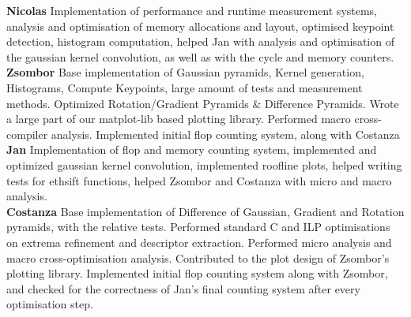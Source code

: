 \documentclass[letterpaper]{article}
\begin{document}
\textbf{Nicolas} Implementation of performance and runtime measurement systems, analysis and optimisation of memory allocations and layout, optimised keypoint detection, histogram computation, helped Jan with analysis and optimisation of the gaussian kernel convolution, as well as with the cycle and memory counters. \\

\textbf{Zsombor} Base implementation of Gaussian pyramids, Kernel generation, Histograms, Compute Keypoints, large amount of tests and measurement methods. Optimized Rotation/Gradient Pyramids & Difference Pyramids. Wrote a large part of our matplot-lib based plotting library. Performed macro cross-compiler analysis. Implemented initial flop counting system, along with Costanza \\

\textbf{Jan} Implementation of flop and memory counting system, implemented and optimized gaussian kernel convolution, implemented roofline plots, helped writing tests for ethsift functions, helped Zsombor and Costanza with micro and macro analysis. \\
 
\textbf{Costanza} Base implementation of Difference of Gaussian, Gradient and Rotation pyramids, with the relative tests. Performed standard C and ILP optimisations on extrema refinement and descriptor extraction. Performed micro analysis and macro cross-optimisation analysis. Contributed to the plot design of Zsombor's plotting library. Implemented initial flop counting system along with Zsombor, and checked for the correctness of Jan's final counting system after every optimisation step. 


\end{document}

